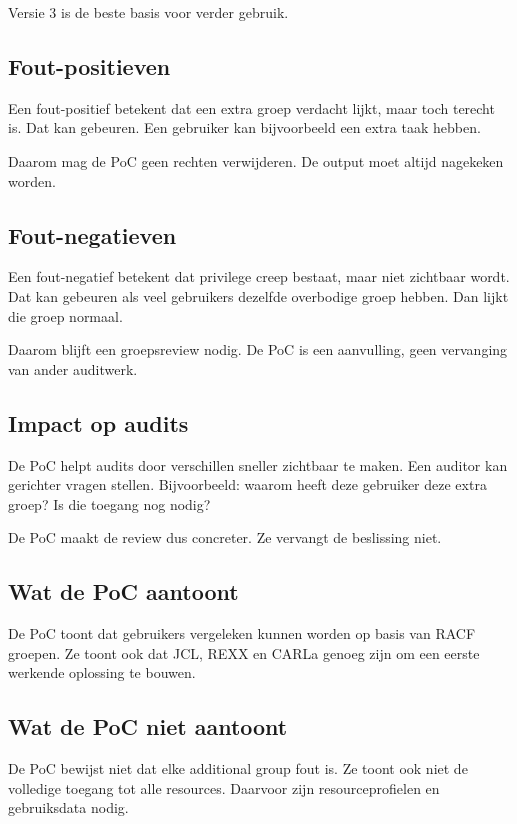 Versie 3 is de beste basis voor verder gebruik.

\subsection*{Fout-positieven}

Een fout-positief betekent dat een extra groep verdacht lijkt, maar toch terecht is. Dat kan gebeuren. Een gebruiker kan bijvoorbeeld een extra taak hebben.

Daarom mag de PoC geen rechten verwijderen. De output moet altijd nagekeken worden.

\subsection*{Fout-negatieven}

Een fout-negatief betekent dat privilege creep bestaat, maar niet zichtbaar wordt. Dat kan gebeuren als veel gebruikers dezelfde overbodige groep hebben. Dan lijkt die groep normaal.

Daarom blijft een groepsreview nodig. De PoC is een aanvulling, geen vervanging van ander auditwerk.

\subsection*{Impact op audits}

De PoC helpt audits door verschillen sneller zichtbaar te maken. Een auditor kan gerichter vragen stellen. Bijvoorbeeld: waarom heeft deze gebruiker deze extra groep? Is die toegang nog nodig?

De PoC maakt de review dus concreter. Ze vervangt de beslissing niet.

\subsection*{Wat de PoC aantoont}

De PoC toont dat gebruikers vergeleken kunnen worden op basis van RACF groepen. Ze toont ook dat JCL, REXX en CARLa genoeg zijn om een eerste werkende oplossing te bouwen.

\subsection*{Wat de PoC niet aantoont}

De PoC bewijst niet dat elke additional group fout is. Ze toont ook niet de volledige toegang tot alle resources. Daarvoor zijn resourceprofielen en gebruiksdata nodig.

